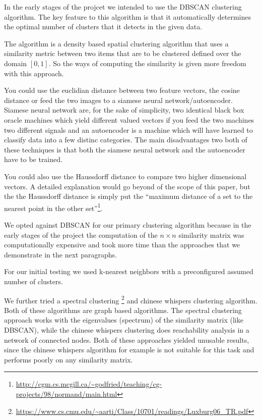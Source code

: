 \documentclass[journal]{vgtc}       %
\begin{document}
In the early stages of the projcet we intended to use the DBSCAN clustering algorithm. 
The key feature to this algorithm is that it automatically determines the optimal number of clusters that it detects in the given data. 

The algorithm is a density based spatial clustering algorithm that uses a similarity metric between two items that are to be  clustered defined over the domain \([0,1]\). So the ways of computing the similarity is given more freedom with this approach.

You could use the euclidian distance between two feature vectors, the cosine distance or feed the two images to a siamese neural network/autoencoder. Siamese neural network are, for the sake of simplicity, two identical black box oracle machines which yield different valued vectors if you feed the two machines two different signals and  an autoencoder is a machine which will have learned to classify data into a few distinc categories. The main disadvantages two both of these techniques is that both the siamese neural network and the autoencoder have to be trained. 

You could also use the Haussdorff distance to compare two higher dimensional vectors. A detailed explanation would go beyond of the scope of this paper, but the the Haussdorff distance is simply put the ``maximum distance of a set to the nearest point in the other set''\footnote{\url{http://cgm.cs.mcgill.ca/~godfried/teaching/cg-projects/98/normand/main.html}}.

We opted against DBSCAN for our primary clustering algorithm because in the early stages of the project the computation of the \(n\times n\) similarity matrix was  computationally expensive and took more time than the approaches that we demonstrate in the next paragraphs.

For our initial testing we used k-nearest neighbors with a preconfigured assumed number of clusters.

We further tried  a  spectral clustering  \footnote{\url{https://www.cs.cmu.edu/~aarti/Class/10701/readings/Luxburg06_TR.pdf}} and chinese whispers clustering algorithm\cite{chinesewhispers}. Both of these algorithms are graph based algorithms. The spectral clustering approach works with the eigenvalues (spectrum) of the similarity matrix (like DBSCAN), while the chinese whispers clustering does reachability analysis in a network of connected nodes.
Both of these approaches yielded unusable results, since the chinese whispers algorithm for example  is not suitable for this task and performs poorly on any similarity matrix.
\end{document}
